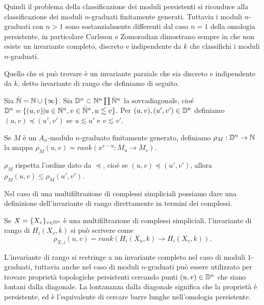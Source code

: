 Quindi il problema della classificazione dei moduli persistenti si riconduce alla classificazione dei moduli $n$-graduati finitamente generati. Tuttavia i moduli $n$-graduati con $n>1$ sono sostanzialmente differenti dal caso $n=1$ della omologia persistente, in particolare Carlsson e Zomorodian dimostrano sempre in \cite{Carlsson2009a} che non esiste un invariante completo, discreto e indipendente da $k$ che classifichi i moduli $n$-graduati.

Quello che si può trovare è un invariante parziale che sia discreto e indipendente da $k$, detto invariante di rango che definiamo di seguito.

\begin{definition}
  Sia $\dot{\mathbb{N}}=\mathbb{N}\cup\{\infty\}$. Sia $\mathbb{D}^n \subset \mathbb{N}^n\prod \dot{\mathbb{N}}^n$ la sovradiagonale, cioé $\mathbb{D}^n = \{(u,v)| u\in \mathbb{N}^n, v\in \dot{\mathbb{N}}^n,u\lesssim v\}$. Per $(u,v), (u',v')\in\mathbb{D}^n$ definiamo $(u,v)\preceq (u',v')$ se $u\lesssim u'$ e $v\lesssim v'$.
\end{definition}

\begin{definition}
  Se $M$ è un $A_n$-modulo $n$-graduato finitamente generato, definiamo $\rho_M:\mathbb{D}^n\to \mathbb{N}$ la mappa $\rho_M(u,v)=rank(x^{v-u}:M_u\to M_v)$.
\end{definition}

\begin{rmk}
  $\rho_M$ rispetta l'ordine dato da $\preceq$, cioé se $(u,v)\preceq (u',v')$, allora $\rho_M(u,v)\leq \rho_M(u',v')$.
\end{rmk}

Nel caso di una multifiltrazione di complessi simpliciali possiamo dare una definizione dell'invariante di rango direttamente in termini dei complessi.

\begin{definition}
  Se $X=\{X_v\}_{v\in\mathbb{N}^n}$ è una multifiltrazione di complessi simpliciali, l'invariante di rango di $H_i(X_v,k)$ si può scrivere come
  \begin{equation*}
    \rho_{X,i}(u,v) = rank(H_i(X_u,k)\to H_i(X_v,k)).
  \end{equation*}
\end{definition}

L'invariante di rango si restringe a un invariante completo nel caso di moduli $1$-graduati, tuttavia anche nel caso di moduli $n$-graduati può essere utilizzato per trovare proprietà topologiche persistenti cercando punti $(u,v)\in \mathbb{D}^n$ che siano lontani dalla diagonale. La lontananza dalla diagonale significa che la proprietà è persistente, ed è l'equivalente di cercare barre lunghe nell'omologia persistente.
